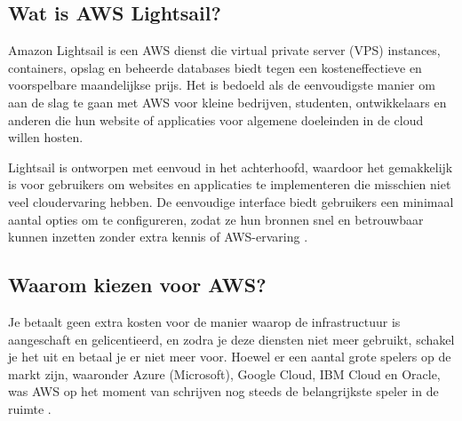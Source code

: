 
\subsection{Wat is AWS Lightsail?}
\label{Wat is AWS Lightsail?}
Amazon Lightsail is een AWS dienst die virtual private server (VPS) instances, containers, opslag en beheerde databases biedt 
tegen een kosteneffectieve en voorspelbare maandelijkse prijs. Het is bedoeld als de eenvoudigste manier om aan de slag te 
gaan met AWS voor kleine bedrijven, studenten, ontwikkelaars en anderen die hun website of applicaties voor algemene doeleinden 
in de cloud willen hosten.
\par
Lightsail is ontworpen met eenvoud in het achterhoofd, waardoor het gemakkelijk is voor gebruikers om websites en 
applicaties te implementeren die misschien niet veel cloudervaring hebben. De eenvoudige interface biedt gebruikers een 
minimaal aantal opties om te configureren, zodat ze hun bronnen snel en betrouwbaar kunnen inzetten zonder extra kennis of 
AWS-ervaring
\autocite{Graf2022}.

\subsection{Waarom kiezen voor AWS?}
\label{Waarom kiezen voor AWS?}
Je betaalt geen extra kosten voor de manier waarop de infrastructuur is aangeschaft en gelicentieerd, 
en zodra je deze diensten niet meer gebruikt, schakel je het uit en betaal je er niet meer voor.
Hoewel er een aantal grote spelers op de markt zijn, waaronder Azure (Microsoft), Google Cloud, IBM Cloud en Oracle, 
was AWS op het moment van schrijven nog steeds de belangrijkste speler in de ruimte
\autocite{Sesto2022}.

